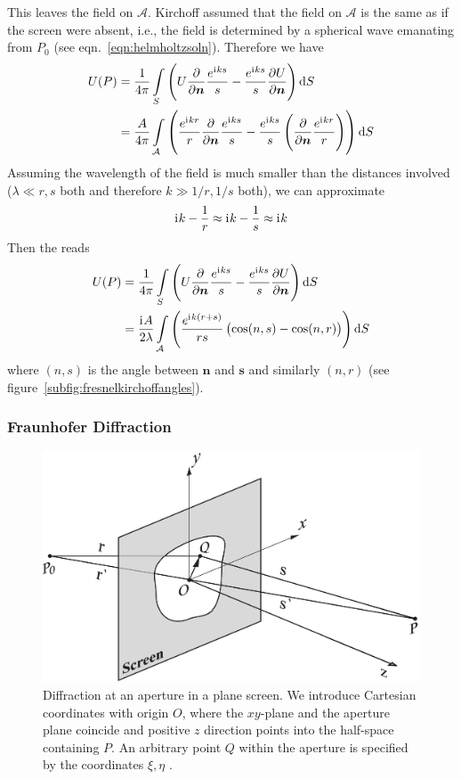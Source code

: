 This leaves the field on \(\mathcal{A}\).
%
Kirchoff assumed that the field on \(\mathcal{A}\) is the same as if the screen were absent, i.e., the field is determined by a spherical wave emanating from \(P_0\) (see eqn.~\eqref{eqn:helmholtzsoln}).
%
Therefore we have 
%
\begin{align}
    U(P) &= \frac{1}{4 \pi}\int\limits_{S} \left( U \pdv{}{\bm{n}} \frac{e^{\iu k s}}{s} - \frac{e^{\iu k s}}{s} \pdv{U}{\bm{n}} \right) \dif S  \\ 
    &= \frac{A}{4 \pi}\int\limits_{\mathcal{A}} \left( \frac{e^{\iu k r}}{r} \pdv{}{\bm{n}} \frac{e^{\iu k s}}{s} - \frac{e^{\iu k s}}{s} \left(\pdv{}{\bm{n}} \frac{e^{\iu k r}}{r}\right) \right) \dif S
\end{align}
%
Assuming the wavelength of the field is much smaller than the distances involved (\(\lambda \ll r, s\) both and therefore \(k \gg 1/r, 1/s\) both), we can approximate 
\[
  \mathrm{i}\mkern1mu k - \frac{1}{r} \approx \mathrm{i}\mkern1mu k - \frac{1}{s} \approx \mathrm{i}\mkern1mu k  
\]
%
Then the  reads
\begin{align}
    U(P) &= \frac{1}{4 \pi}\int\limits_{S} \left( U \pdv{}{\bm{n}} \frac{e^{\iu k s}}{s} - \frac{e^{\iu k s}}{s} \pdv{U}{\bm{n}} \right) \dif S  \\ 
    &= \frac{\iu A}{2 \lambda}\int\limits_{\mathcal{A}}  \left( \frac{e^{\iu k (r+s)}}{r s} \left(\cos(n, s) - \cos(n, r) \right) \right) \dif S \label{eqn:fresnelkirchoff}
\end{align}
%
where \((n, s)\) is the angle between \(\bm{n}\) and \(\bm{s}\) and similarly \((n, r)\) (see figure~\ref{subfig:fresnelkirchoffangles}).

\subsubsection{Fraunhofer Diffraction}

\begin{figure}
    \centering 
    \includegraphics[width=\linewidth]{figures/appendix/plane-screen.png}
    \caption{Diffraction at an aperture in a plane screen. We introduce Cartesian coordinates with origin \(O\), where the \(xy\)-plane
    and the aperture plane coincide and positive \(z\) direction points into the half-space containing \(P\). An arbitrary point \(Q\) within
    the aperture is specified by the coordinates \(\xi, \eta\) \cite{Ivanov2016ElementsOD}.}\label{fig:planescreen}
\end{figure}

